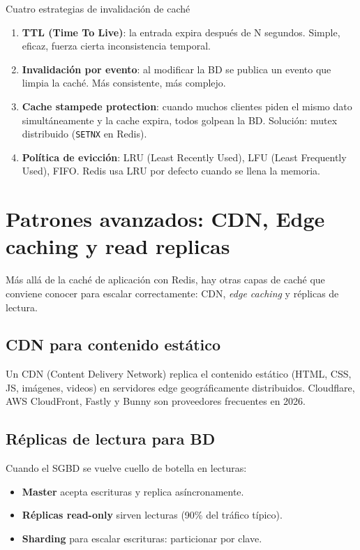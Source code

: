 \documentclass[11pt,a4paper,openany]{book}
\begin{document}
\begin{cajabuenas}{Cuatro estrategias de invalidación de caché}
\begin{enumerate}
\item \textbf{TTL (Time To Live)}: la entrada expira después de
N segundos. Simple, eficaz, fuerza cierta inconsistencia temporal.
\item \textbf{Invalidación por evento}: al modificar la BD se publica
un evento que limpia la caché. Más consistente, más complejo.
\item \textbf{Cache stampede protection}: cuando muchos clientes
piden el mismo dato simultáneamente y la cache expira, todos
golpean la BD. Solución: mutex distribuido (\texttt{SETNX} en Redis).
\item \textbf{Política de evicción}: LRU (Least Recently Used), LFU
(Least Frequently Used), FIFO. Redis usa LRU por defecto cuando se
llena la memoria.
\end{enumerate}
\end{cajabuenas}

\section{Patrones avanzados: CDN, Edge caching y read replicas}

Más allá de la caché de aplicación con Redis, hay otras
capas de caché que conviene conocer para escalar correctamente:
CDN, \emph{edge caching} y réplicas de lectura.


\subsection{CDN para contenido estático}

Un CDN (Content Delivery Network) replica el contenido estático
(HTML, CSS, JS, imágenes, videos) en servidores edge geográficamente
distribuidos. Cloudflare, AWS CloudFront, Fastly y Bunny son
proveedores frecuentes en 2026.

\subsection{Réplicas de lectura para BD}

Cuando el SGBD se vuelve cuello de botella en lecturas:

\begin{itemize}
\item \textbf{Master} acepta escrituras y replica asíncronamente.
\item \textbf{Réplicas read-only} sirven lecturas (90\% del tráfico
típico).
\item \textbf{Sharding} para escalar escrituras: particionar por clave.
\end{itemize}
\end{document}
